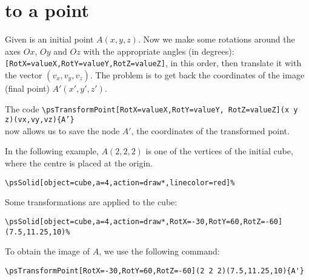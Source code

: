 \section{ to a point}

Given is an initial point $A(x,y,z)$. Now we make some
rotations around the axes $Ox$, $Oy$ and $Oz$ with the appropriate angles (in degrees):
\verb+[RotX=valueX,RotY=valueY,RotZ=valueZ]+, in this order,
then translate it with the vector $(v_x,v_y,v_z)$. The problem is to get back
the coordinates of the image (final point) $A'(x',y',z')$.

The code
\texttt{\textbackslash psTransformPoint[RotX=valueX,RotY=valueY,
 RotZ=valueZ](x y z)(vx,vy,vz)\{A'\}}\\
now allows us to save the node $A'$, the coordinates of the transformed point.

In the following example, $A(2,2,2)$ is one of the vertices of the initial
cube, where the centre is placed at the origin.

\begin{verbatim}
\psSolid[object=cube,a=4,action=draw*,linecolor=red]%
\end{verbatim}

Some transformations are applied to the cube:

\begin{verbatim}
\psSolid[object=cube,a=4,action=draw*,RotX=-30,RotY=60,RotZ=-60](7.5,11.25,10)%
\end{verbatim}

To obtain the image of $A$, we use the following command:


\begin{verbatim}
\psTransformPoint[RotX=-30,RotY=60,RotZ=-60](2 2 2)(7.5,11.25,10){A'}
\end{verbatim}

